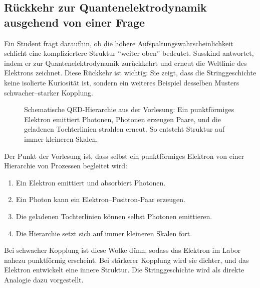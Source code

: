 \subsection{Rückkehr zur Quantenelektrodynamik ausgehend von einer Frage}

Ein Student fragt daraufhin, ob die höhere Aufspaltungswahrscheinlichkeit schlicht eine kompliziertere Struktur ``weiter oben'' bedeutet. Susskind antwortet, indem er zur Quantenelektrodynamik zurückkehrt und erneut die Weltlinie des Elektrons zeichnet. Diese Rückkehr ist wichtig: Sie zeigt, dass die Stringgeschichte keine isolierte Kuriosität ist, sondern ein weiteres Beispiel desselben Musters schwacher--starker Kopplung.

\begin{figure}[htbp]\centering
{}\caption{Schematische QED-Hierarchie aus der Vorlesung: Ein punktförmiges Elektron emittiert Photonen, Photonen erzeugen Paare, und die geladenen Tochterlinien strahlen erneut. So entsteht Struktur auf immer kleineren Skalen.}\end{figure}

Der Punkt der Vorlesung ist, dass selbst ein punktförmiges Elektron von einer Hierarchie von Prozessen begleitet wird:
\begin{enumerate}
\item Ein Elektron emittiert und absorbiert Photonen.
\item Ein Photon kann ein Elektron--Positron-Paar erzeugen.
\item Die geladenen Tochterlinien können selbst Photonen emittieren.
\item Die Hierarchie setzt sich auf immer kleineren Skalen fort.
\end{enumerate}
Bei schwacher Kopplung ist diese Wolke dünn, sodass das Elektron im Labor nahezu punktförmig erscheint. Bei stärkerer Kopplung wird sie dichter, und das Elektron entwickelt eine innere Struktur. Die Stringgeschichte wird als direkte Analogie dazu vorgestellt.

